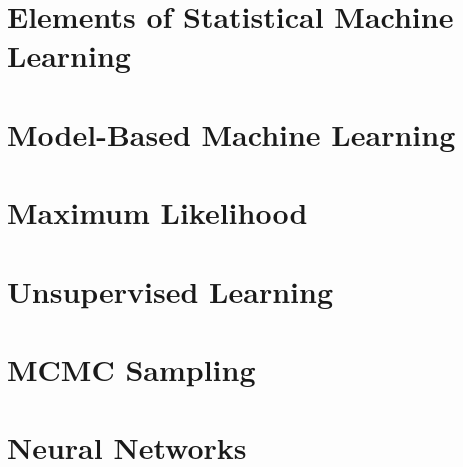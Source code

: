 \documentclass[toc]{../cs-classes/cs-classes}
\begin{document}
\begin{example}
\end{example}

\begin{example}
\end{example}

\section{Elements of Statistical Machine Learning}

\section{Model-Based Machine Learning}

\section{Maximum Likelihood}

\section{Unsupervised Learning}

\section{MCMC Sampling}

\section{Neural Networks}
\end{document}
